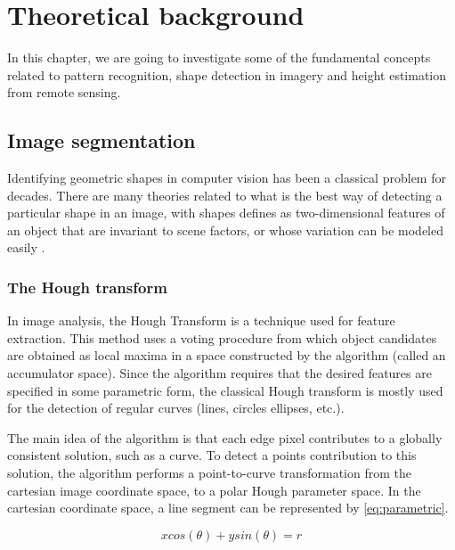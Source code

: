 \chapter{Theoretical background}
In this chapter, we are going to investigate some of the fundamental concepts related to pattern recognition, shape detection in imagery and height estimation from remote sensing. 

\section{Image segmentation}
Identifying geometric shapes in computer vision has been a classical problem for decades. There are many theories related to what is the best way of detecting a particular shape in an image, with shapes defines as two-dimensional features of an object that are invariant to scene factors, or whose variation can be modeled easily \citep{Moon2002}.

\subsection{The Hough transform}
In image analysis, the Hough Transform is a technique used for feature extraction. This method uses a voting procedure from which object candidates are obtained as local maxima in a space constructed by the algorithm (called an accumulator space). Since the algorithm requires that the desired features are specified in some parametric form, the classical Hough transform is mostly used for the detection of regular curves (lines, circles ellipses, etc.).

The main idea of the algorithm is that each edge pixel contributes to a globally consistent solution, such as a curve. To detect a points contribution to this solution, the algorithm performs a point-to-curve transformation from the cartesian image coordinate space, to a polar Hough parameter space. In the cartesian coordinate space, a line segment can be represented by \autoref{eq:parametric}.

\begin{equation}
	xcos(\theta) + ysin(\theta) = r
	\label{eq:parametric}
\end{equation}

